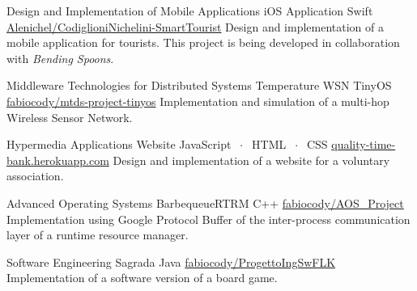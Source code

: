 

\begin{cventries}

\cventry
    {Design and Implementation of Mobile Applications}
    {iOS Application}
    {Swift}
    {\href{https://github.com/Alenichel/CodiglioniNichelini-SmartTourist}{\faGithub\acvHeaderIconSep Alenichel/CodiglioniNichelini-SmartTourist}}
    {Design and implementation of a mobile application for tourists. This project is being developed in collaboration with \textit{Bending Spoons}.}
    
\cventry
    {Middleware Technologies for Distributed Systems}
    {Temperature WSN}
    {TinyOS}
    {\href{https://github.com/fabiocody/mtds-project-tinyos}{\faGithub\acvHeaderIconSep fabiocody/mtds-project-tinyos}}
    {Implementation and simulation of a multi-hop Wireless Sensor Network.}
    
\cventry
    {Hypermedia Applications}
    {Website}
    {JavaScript $\;\cdot\;$ HTML $\;\cdot\;$ CSS}
    {\href{https://quality-time-bank.herokuapp.com}{\faGlobe\acvHeaderIconSep quality-time-bank.herokuapp.com}}
    {Design and implementation of a website for a voluntary association.}
    
\cventry
    {Advanced Operating Systems}
    {BarbequeueRTRM}
    {C++}
    {\href{https://github.com/fabiocody/AOS\_Project/tree/protobuf}{\faGithub\acvHeaderIconSep fabiocody/AOS\_Project}}
    {Implementation using Google Protocol Buffer of the inter-process communication layer of a runtime resource manager.}
    
\cventry
    {Software Engineering}
    {Sagrada}
    {Java}
    {\href{https://github.com/fabiocody/ProgettoIngSwFLK}{\faGithub\acvHeaderIconSep fabiocody/ProgettoIngSwFLK}}
    {Implementation of a software version of a board game.}
\end{cventries}
